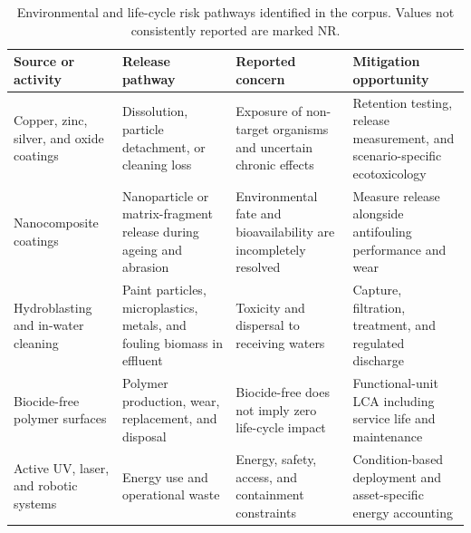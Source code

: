 \begin{table}[t]
\centering
\caption{Environmental and life-cycle risk pathways identified in the corpus. Values not consistently reported are marked NR.}
\label{tab:risk}
\small
\begin{tabularx}{\textwidth}{l l X X}
\toprule
Source or activity & Release pathway & Reported concern & Mitigation opportunity \\
\midrule
Copper, zinc, silver, and oxide coatings & Dissolution, particle detachment, or cleaning loss & Exposure of non-target organisms and uncertain chronic effects & Retention testing, release measurement, and scenario-specific ecotoxicology \\
Nanocomposite coatings & Nanoparticle or matrix-fragment release during ageing and abrasion & Environmental fate and bioavailability are incompletely resolved & Measure release alongside antifouling performance and wear \\
Hydroblasting and in-water cleaning & Paint particles, microplastics, metals, and fouling biomass in effluent & Toxicity and dispersal to receiving waters & Capture, filtration, treatment, and regulated discharge \\
Biocide-free polymer surfaces & Polymer production, wear, replacement, and disposal & Biocide-free does not imply zero life-cycle impact & Functional-unit LCA including service life and maintenance \\
Active UV, laser, and robotic systems & Energy use and operational waste & Energy, safety, access, and containment constraints & Condition-based deployment and asset-specific energy accounting \\
\bottomrule
\end{tabularx}
\end{table}
